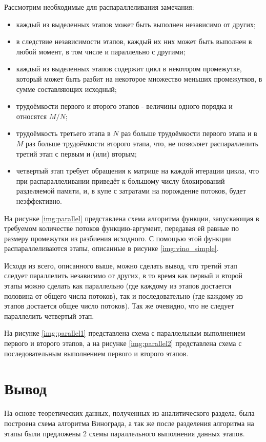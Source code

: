Рассмотрим необходимые для распараллеливания замечания:
\begin{itemize}
	\item каждый из выделенных этапов может быть выполнен независимо от других;
	\item в следствие независимости этапов, каждый их них может быть выполнен в любой момент, в том числе и параллельно с другими;
	\item каждый из выделенных этапов содержит цикл в некотором промежутке, который может быть разбит на некоторое множество меньших промежутков, в сумме составляющих исходный;
	\item трудоёмкости первого и второго этапов - величины одного порядка и относятся $M / N$;
	\item трудоёмкость третьего этапа в $N$ раз больше трудоёмкости первого этапа и в $M$ раз больше трудоёмкости второго этапа, что, не позволяет распараллелить третий этап с первым и (или) вторым;
	\item четвертый этап требует обращения к матрице на каждой итерации цикла, что при распараллеливании приведёт к большому числу блокирований разделяемой памяти, и, в купе с затратами на порождение потоков, будет неэффективно.
\end{itemize}
\clearpage

На рисунке \ref{img:parallel} представлена схема алгоритма функции, запускающая в требуемом количестве потоков функцию-аргумент, передавая ей равные по размеру промежутки из разбиения исходного. С помощью этой функции распараллеливаются этапы, описанные в рисунке \ref{img:vino_simple}.

Исходя из всего, описанного выше, можно сделать вывод, что третий этап следует параллелить независимо от других, в то время как первый и второй этапы можно сделать как параллельно (где каждому из этапов достается половина от общего числа потоков), так и последовательно (где каждому из этапов достается общее число потоков). Так же очевидно, что не следует параллелить четвертый этап.

На рисунке \ref{img:parallel1} представлена схема с параллельным выполнением первого и второго этапов, а на рисунке \ref{img:parallel2} представлена схема с последовательным выполнением первого и второго этапов.

\clearpage

\section*{Вывод}

На основе теоретических данных, полученных из аналитического раздела, была построена схема алгоритма Винограда, а так же после разделения алгоритма на этапы были предложены 2 схемы параллельного выполнения данных этапов.
